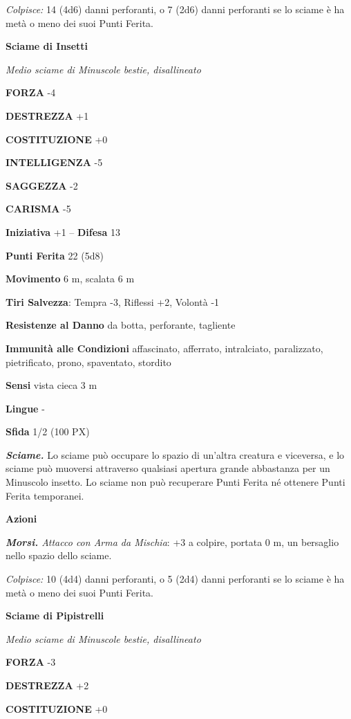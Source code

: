 \begin{multicols}{2}
\textit{Colpisce:} 14 (4d6) danni perforanti, o 7 (2d6) danni perforanti se lo sciame è ha metà o meno dei suoi Punti Ferita.

\medskip\textbf{Sciame di Insetti}

\textit{Medio sciame di Minuscole bestie, disallineato}

\textbf{FORZA} -4

\textbf{DESTREZZA} +1

\textbf{COSTITUZIONE} +0

\textbf{INTELLIGENZA} -5

\textbf{SAGGEZZA} -2

\textbf{CARISMA} -5

\textbf{Iniziativa} +1 -- \textbf{Difesa} 13

\textbf{Punti Ferita} 22 (5d8)

\textbf{Movimento} 6 m, scalata 6 m

\textbf{Tiri Salvezza}: Tempra -3, Riflessi +2, Volontà -1

\textbf{Resistenze al Danno} da botta, perforante, tagliente

\textbf{Immunità alle Condizioni} affascinato, afferrato, intralciato, paralizzato, pietrificato, prono, spaventato, stordito

\textbf{Sensi} vista cieca 3 m

\textbf{Lingue} -

\textbf{Sfida} 1/2 (100 PX)

\textit{\textbf{Sciame.}} Lo sciame può occupare lo spazio di un'altra creatura e viceversa, e lo sciame può muoversi attraverso qualsiasi apertura grande abbastanza per un Minuscolo insetto. Lo sciame non può recuperare Punti Ferita né ottenere Punti Ferita temporanei.

\textbf{Azioni}

\textit{\textbf{Morsi.} Attacco con Arma da Mischia}: +3 a colpire, portata 0 m, un bersaglio nello spazio dello sciame.

\textit{Colpisce:} 10 (4d4) danni perforanti, o 5 (2d4) danni perforanti se lo sciame è ha metà o meno dei suoi Punti Ferita.

\medskip\textbf{Sciame di Pipistrelli}

\textit{Medio sciame di Minuscole bestie, disallineato}

\textbf{FORZA} -3

\textbf{DESTREZZA} +2

\textbf{COSTITUZIONE} +0


\end{multicols}
